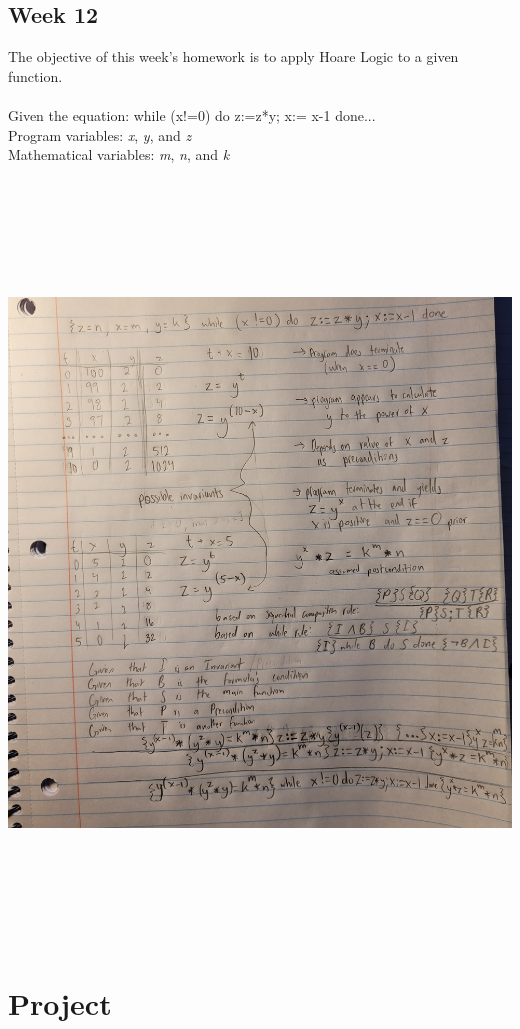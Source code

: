 \documentclass{article}
\theoremstyle{theorem}
\theoremstyle{definition}
\theoremstyle{remark}
\begin{document}
\subsection{Week 12}
The objective of this week's homework is to apply Hoare Logic to a given function.
\\
\\
Given the equation: while (x!=0) do z:=z*y;  x:= x-1 done...
\\
Program variables: \textit{x}, \textit{y}, and \textit{z}
\\
Mathematical variables: \textit{m}, \textit{n}, and \textit{k}
\\
\\ \includegraphics[width=18cm, height=20cm]{Report Images/week12.jpg}

\section{Project}\label{Project}
\end{document}
